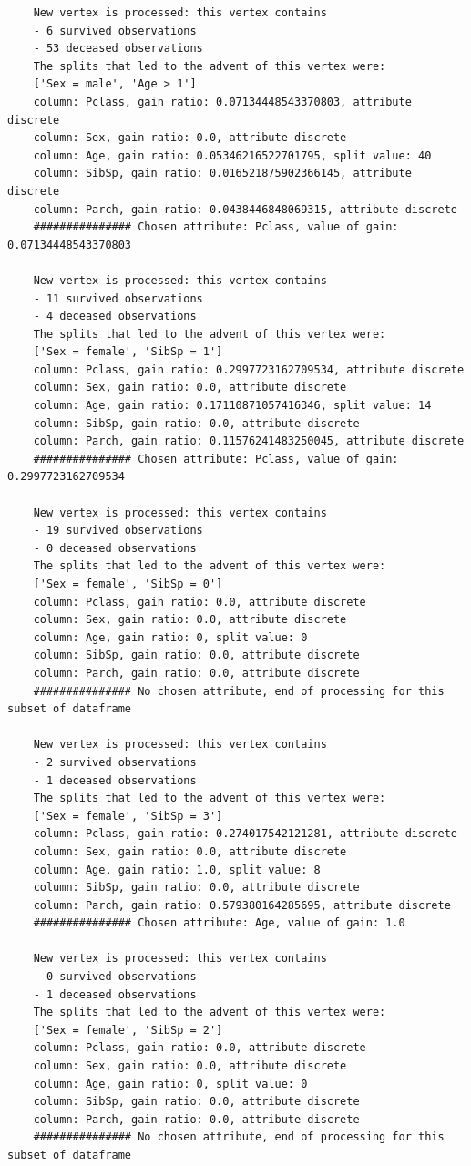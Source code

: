 \documentclass[12pt]{article}
\begin{document}
\begin{verbatim}
	New vertex is processed: this vertex contains
	- 6 survived observations
	- 53 deceased observations
	The splits that led to the advent of this vertex were:
	['Sex = male', 'Age > 1']
	column: Pclass, gain ratio: 0.07134448543370803, attribute discrete
	column: Sex, gain ratio: 0.0, attribute discrete
	column: Age, gain ratio: 0.05346216522701795, split value: 40
	column: SibSp, gain ratio: 0.016521875902366145, attribute discrete
	column: Parch, gain ratio: 0.0438446848069315, attribute discrete
	############### Chosen attribute: Pclass, value of gain: 0.07134448543370803
	
	New vertex is processed: this vertex contains
	- 11 survived observations
	- 4 deceased observations
	The splits that led to the advent of this vertex were:
	['Sex = female', 'SibSp = 1']
	column: Pclass, gain ratio: 0.2997723162709534, attribute discrete
	column: Sex, gain ratio: 0.0, attribute discrete
	column: Age, gain ratio: 0.17110871057416346, split value: 14
	column: SibSp, gain ratio: 0.0, attribute discrete
	column: Parch, gain ratio: 0.11576241483250045, attribute discrete
	############### Chosen attribute: Pclass, value of gain: 0.2997723162709534
	
	New vertex is processed: this vertex contains
	- 19 survived observations
	- 0 deceased observations
	The splits that led to the advent of this vertex were:
	['Sex = female', 'SibSp = 0']
	column: Pclass, gain ratio: 0.0, attribute discrete
	column: Sex, gain ratio: 0.0, attribute discrete
	column: Age, gain ratio: 0, split value: 0
	column: SibSp, gain ratio: 0.0, attribute discrete
	column: Parch, gain ratio: 0.0, attribute discrete
	############### No chosen attribute, end of processing for this subset of dataframe
	
	New vertex is processed: this vertex contains
	- 2 survived observations
	- 1 deceased observations
	The splits that led to the advent of this vertex were:
	['Sex = female', 'SibSp = 3']
	column: Pclass, gain ratio: 0.274017542121281, attribute discrete
	column: Sex, gain ratio: 0.0, attribute discrete
	column: Age, gain ratio: 1.0, split value: 8
	column: SibSp, gain ratio: 0.0, attribute discrete
	column: Parch, gain ratio: 0.579380164285695, attribute discrete
	############### Chosen attribute: Age, value of gain: 1.0
	
	New vertex is processed: this vertex contains
	- 0 survived observations
	- 1 deceased observations
	The splits that led to the advent of this vertex were:
	['Sex = female', 'SibSp = 2']
	column: Pclass, gain ratio: 0.0, attribute discrete
	column: Sex, gain ratio: 0.0, attribute discrete
	column: Age, gain ratio: 0, split value: 0
	column: SibSp, gain ratio: 0.0, attribute discrete
	column: Parch, gain ratio: 0.0, attribute discrete
	############### No chosen attribute, end of processing for this subset of dataframe
	

\end{verbatim}
\end{document}
